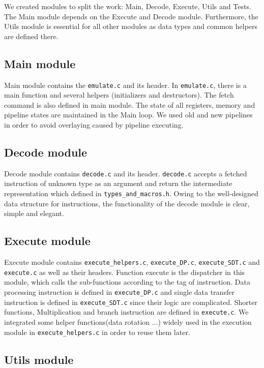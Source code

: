 \documentclass[10pt]{article}
\begin{document}
	We created modules to split the work: Main, Decode, Execute, Utils and Tests. The Main module depends on the Execute and Decode module. Furthermore, the Utils module is essential for all other modules as data types and common helpers are defined there.
	
	\subsection{Main module}
	
	Main module contains the \texttt{emulate.c} and its header. In \texttt{emulate.c}, there is a main function and several helpers (initializers and destructors). The fetch command is also defined in main module. The state of all registers, memory and pipeline states are maintained in the Main loop. We used old and new pipelines in order to avoid overlaying caused by pipeline executing.
	
	\subsection{Decode module}
	
	Decode module contains \texttt{decode.c} and its header. \texttt{decode.c} accepts a fetched instruction of unknown type as an argument and return the intermediate representation which defined in \texttt{types\_and\_macros.h}. Owing to the well-designed data structure for instructions, the functionality of the decode module is clear, simple and elegant.
	
	\subsection{Execute module}
	
	Execute module contains \texttt{execute\_helpers.c}, \texttt{execute\_DP.c}, \texttt{execute\_SDT.c} and \texttt{execute.c} as well as their headers. Function execute is the dispatcher in this module, which calls the sub-functions according to the tag of instruction. 
	Data processing instruction is defined in \texttt{execute\_DP.c} and single data transfer instruction is defined in \texttt{execute\_SDT.c} since their logic are complicated. Shorter functions, Multiplication and branch instruction are defined in \texttt{execute.c}. We integrated some helper functions(data rotation ...) widely used in the execution module in \texttt{execute\_helpers.c} in order to reuse them later.
	
	\subsection{Utils module}
	
\end{document}
